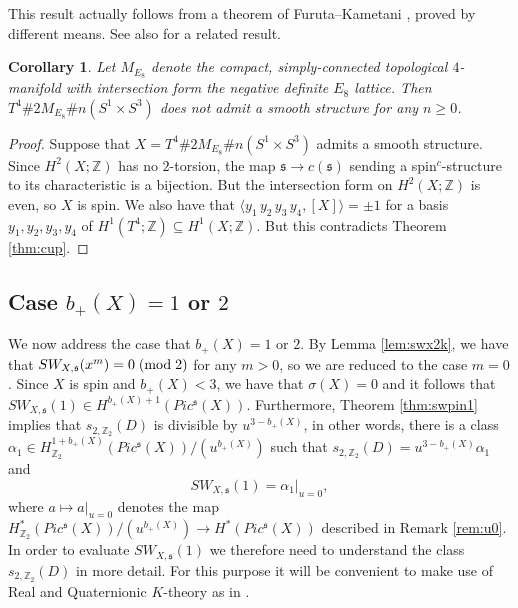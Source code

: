 \documentclass{amsart}
\newtheorem{corollary}[theorem]{Corollary}
\theoremstyle{definition}
\theoremstyle{remark}
\numberwithin{equation}{section}
\begin{document}
This result actually follows from a theorem of Furuta--Kametani \cite[Theorem 5]{fk}, proved by different means. See also \cite[Theorem 4]{na2} for a related result.

\begin{corollary}\label{cor:notsmooth}
Let $M_{E_8}$ denote the compact, simply-connected topological $4$-manifold with intersection form the negative definite $E_8$ lattice. Then $T^4 \# 2M_{E_8} \# n(S^1 \times S^3)$ does not admit a smooth structure for any $n \ge 0$.
\end{corollary}
\begin{proof}

Suppose that $X = T^4 \# 2M_{E_8} \# n(S^1 \times S^3)$ admits a smooth structure. Since $H^2(X ; \mathbb{Z})$ has no $2$-torsion, the map $\mathfrak{s} \to c(\mathfrak{s})$ sending a spin$^c$-structure to its characteristic is a bijection. But the intersection form on $H^2(X ; \mathbb{Z})$ is even, so $X$ is spin. We also have that $\langle y_1 \,y_2\, y_3\,  y_4 , [X] \rangle = \pm 1$ for a basis $y_1, y_2, y_3 , y_4$ of $H^1( T^4 ; \mathbb{Z}) \subseteq H^1(X ; \mathbb{Z})$. But this contradicts Theorem \ref{thm:cup}.
\end{proof}

\subsection{Case $b_+(X) =1$ or $2$}\label{sec:b+12}

We now address the case that $b_+(X) =1$ or $2$. By Lemma \ref{lem:swx2k}, we have that $SW_{X , \mathfrak{s}}(x^m) = 0 \; ({\rm mod} \; 2)$ for any $m>0$, so we are reduced to the case $m=0$. Since $X$ is spin and $b_+(X) < 3$, we have that $\sigma(X) = 0$ and it follows that $SW_{X , \mathfrak{s}}(1) \in H^{b_+(X)+1}( Pic^{\mathfrak{s}}(X))$. Furthermore, Theorem \ref{thm:swpin1} implies that $s_{2 , \mathbb{Z}_2}(D)$ is divisible by $u^{3-b_+(X)}$, in other words, there is a class $\alpha_1 \in H^{1+b_+(X)}_{\mathbb{Z}_2}( Pic^{\mathfrak{s}}(X) )/(u^{b_+(X)})$ such that $s_{2,\mathbb{Z}_2}(D) = u^{3-b_+(X)} \alpha_1$ and
\begin{equation}\label{equ:swb+12}
SW_{X , \mathfrak{s}}(1) = \alpha_1|_{u=0},
\end{equation}
where $a \mapsto a|_{u=0}$ denotes the map $H^*_{\mathbb{Z}_2}( Pic^{\mathfrak{s}}(X) )/(u^{b_+(X)}) \to H^*( Pic^{\mathfrak{s}}(X) )$ described in Remark \ref{rem:u0}. In order to evaluate $SW_{X , \mathfrak{s}}(1)$ we therefore need to understand the class $s_{2, \mathbb{Z}_2}(D)$ in more detail. For this purpose it will be convenient to make use of Real and Quaternionic $K$-theory as in \cite{at,dup}. 
\end{document}
